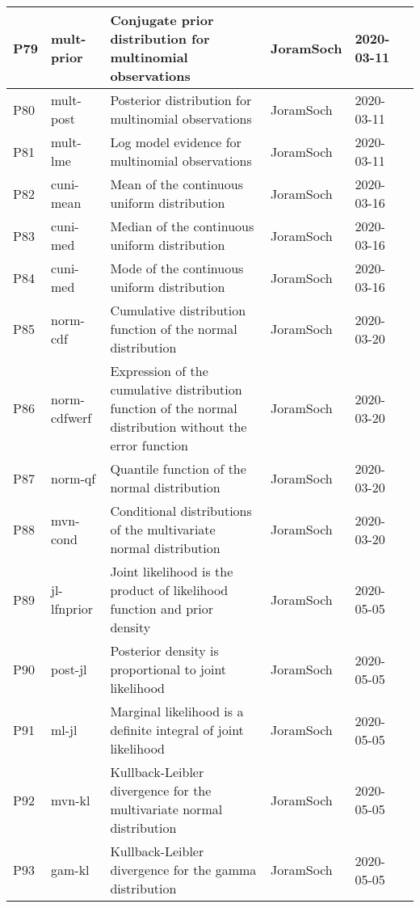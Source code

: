 \documentclass[a4paper,12pt,twoside]{book}
\begin{document}
\begin{longtable}{|p{1cm}|p{2cm}|p{6.5cm}|p{3cm}|p{2cm}|c|}
P79 & mult-prior & Conjugate prior distribution for multinomial observations & JoramSoch & 2020-03-11 & \pageref{sec:mult-prior} \\ \hline
P80 & mult-post & Posterior distribution for multinomial observations & JoramSoch & 2020-03-11 & \pageref{sec:mult-post} \\ \hline
P81 & mult-lme & Log model evidence for multinomial observations & JoramSoch & 2020-03-11 & \pageref{sec:mult-lme} \\ \hline
P82 & cuni-mean & Mean of the continuous uniform distribution & JoramSoch & 2020-03-16 & \pageref{sec:cuni-mean} \\ \hline
P83 & cuni-med & Median of the continuous uniform distribution & JoramSoch & 2020-03-16 & \pageref{sec:cuni-med} \\ \hline
P84 & cuni-med & Mode of the continuous uniform distribution & JoramSoch & 2020-03-16 & \pageref{sec:cuni-med} \\ \hline
P85 & norm-cdf & Cumulative distribution function of the normal distribution & JoramSoch & 2020-03-20 & \pageref{sec:norm-cdf} \\ \hline
P86 & norm-cdfwerf & Expression of the cumulative distribution function of the normal distribution without the error function & JoramSoch & 2020-03-20 & \pageref{sec:norm-cdfwerf} \\ \hline
P87 & norm-qf & Quantile function of the normal distribution & JoramSoch & 2020-03-20 & \pageref{sec:norm-qf} \\ \hline
P88 & mvn-cond & Conditional distributions of the multivariate normal distribution & JoramSoch & 2020-03-20 & \pageref{sec:mvn-cond} \\ \hline
P89 & jl-lfnprior & Joint likelihood is the product of likelihood function and prior density & JoramSoch & 2020-05-05 & \pageref{sec:jl-lfnprior} \\ \hline
P90 & post-jl & Posterior density is proportional to joint likelihood & JoramSoch & 2020-05-05 & \pageref{sec:post-jl} \\ \hline
P91 & ml-jl & Marginal likelihood is a definite integral of joint likelihood & JoramSoch & 2020-05-05 & \pageref{sec:ml-jl} \\ \hline
P92 & mvn-kl & Kullback-Leibler divergence for the multivariate normal distribution & JoramSoch & 2020-05-05 & \pageref{sec:mvn-kl} \\ \hline
P93 & gam-kl & Kullback-Leibler divergence for the gamma distribution & JoramSoch & 2020-05-05 & \pageref{sec:gam-kl} \\ \hline

\end{longtable}
\end{document}
